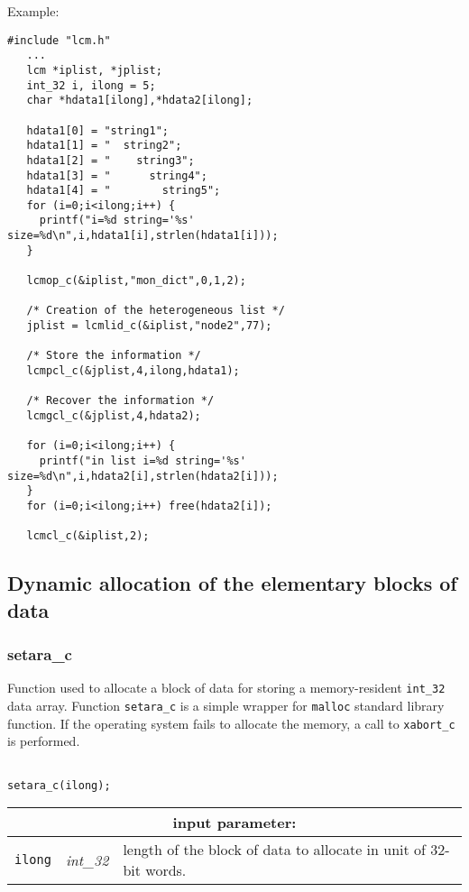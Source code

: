 \noindent Example:
\begin{verbatim}
#include "lcm.h"
   ...
   lcm *iplist, *jplist;
   int_32 i, ilong = 5;
   char *hdata1[ilong],*hdata2[ilong];

   hdata1[0] = "string1";
   hdata1[1] = "  string2";
   hdata1[2] = "    string3";
   hdata1[3] = "      string4";
   hdata1[4] = "        string5";
   for (i=0;i<ilong;i++) {
     printf("i=%d string='%s' size=%d\n",i,hdata1[i],strlen(hdata1[i]));
   }

   lcmop_c(&iplist,"mon_dict",0,1,2);

   /* Creation of the heterogeneous list */
   jplist = lcmlid_c(&iplist,"node2",77);

   /* Store the information */
   lcmpcl_c(&jplist,4,ilong,hdata1);

   /* Recover the information */
   lcmgcl_c(&jplist,4,hdata2);

   for (i=0;i<ilong;i++) {
     printf("in list i=%d string='%s' size=%d\n",i,hdata2[i],strlen(hdata2[i]));
   }
   for (i=0;i<ilong;i++) free(hdata2[i]);

   lcmcl_c(&iplist,2);
\end{verbatim}

\vskip 0.8cm

\subsection{Dynamic allocation of the elementary blocks of data}

\subsubsection{setara\_c}\label{sect:setara}

Function used to allocate a block of data for storing a memory-resident {\tt int\_32} data array.
Function {\tt setara\_c} is a simple wrapper for {\tt malloc} standard library function.
If the operating system fails to allocate the memory, a call to {\tt xabort\_c} is performed.

\begin{verbatim}

setara_c(ilong);
\end{verbatim}

\noindent
\begin{tabular}{|p{1.5cm}|p{2cm}|p{11cm}|}
\hline
\multicolumn{3}{|c|}{\bf input parameter:} \\
\hline
{\tt ilong} & {\it int\_32} & length of the block of data to allocate in unit of 32-bit words. \\
\hline
\end{tabular}

